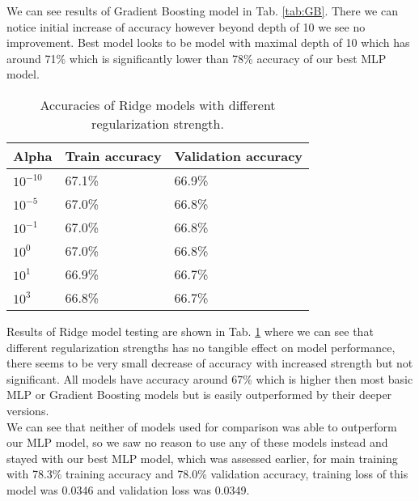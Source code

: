 We can see results of Gradient Boosting model in Tab. \ref{tab:GB}. There we can notice initial increase of accuracy however beyond depth of 10 we see no improvement. Best model looks to be model with maximal depth of 10 which has around 71\% which is significantly lower than 78\% accuracy of our best MLP model.
\\

\begin{table}[!h]
	\centering
	\begin{tabular}{|l|l|l|}
		\hline
		Alpha      & Train accuracy & Validation accuracy \\ \hline
		$10^{-10}$ & 67.1\%         & 66.9\%              \\ \hline
		$10^{-5}$  & 67.0\%         & 66.8\%              \\ \hline
		$10^{-1}$  & 67.0\%         & 66.8\%              \\ \hline
		$10^{0}$   & 67.0\%         & 66.8\%              \\ \hline
		$10^{1}$   & 66.9\%         & 66.7\%              \\ \hline
		$10^{3}$   & 66.8\%         & 66.7\%              \\ \hline
	\end{tabular}
	\caption{Accuracies of Ridge models with different regularization strength.}
	\label{tab:Ridge}
\end{table}

Results of Ridge model testing are shown in Tab. \ref{tab:Ridge} where we can see that different regularization strengths has no tangible effect on model performance, there seems to be very small decrease of accuracy with increased strength but not significant. All models have accuracy around 67\% which is higher then most basic MLP or Gradient Boosting models but is easily outperformed by their deeper versions.
\\

We can see that neither of models used for comparison was able to outperform our MLP model, so we saw no reason to use any of these models instead and stayed with our best MLP model, which was assessed earlier, for main training with 78.3\% training accuracy and 78.0\% validation accuracy, training loss of this model was 0.0346 and validation loss was 0.0349.
